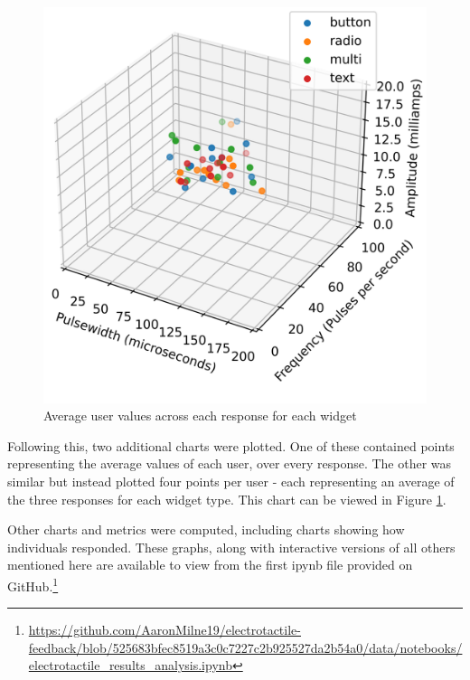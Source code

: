 \documentclass{mpaper}
\begin{document}
\begin{figure}
    \centering
    \includegraphics[scale=0.5]{images/avg_responses_widgets.png}
    \caption{Average user values across each response for each widget}
    \label{fig:avg-user-responses-widgets}
\end{figure}

Following this, two additional charts were plotted. One of these contained points representing the average values of each user, over every response. The other was similar but instead plotted four points per user - each representing an average of the three responses for each widget type. This chart can be viewed in Figure \ref{fig:avg-user-responses-widgets}.

Other charts and metrics were computed, including charts showing how individuals responded. These graphs, along with interactive versions of all others mentioned here are available to view from the first ipynb file provided on GitHub.\footnote{\url{https://github.com/AaronMilne19/electrotactile-feedback/blob/525683bfec8519a3c0c7227c2b925527da2b54a0/data/notebooks/electrotactile_results_analysis.ipynb}}\\
\end{document}
